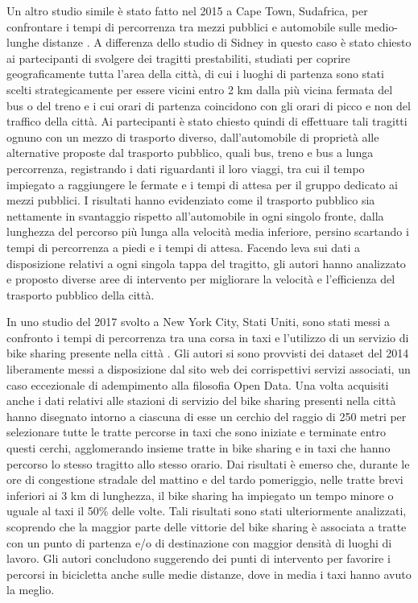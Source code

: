 Un altro studio simile è stato fatto nel 2015 a Cape Town, Sudafrica, per confrontare i tempi di percorrenza tra mezzi pubblici e automobile sulle medio-lunghe distanze \cite{hitge2015comparison}. A differenza dello studio di Sidney in questo caso è stato chiesto ai partecipanti di svolgere dei tragitti prestabiliti, studiati per coprire geograficamente tutta l'area della città, di cui i luoghi di partenza sono stati scelti strategicamente per essere vicini entro 2 km dalla più vicina fermata del bus o del treno e i cui orari di partenza coincidono con gli orari di picco e non del traffico della città. Ai partecipanti è stato chiesto quindi di effettuare tali tragitti ognuno con un mezzo di trasporto diverso, dall'automobile di proprietà alle alternative proposte dal trasporto pubblico, quali bus, treno e bus a lunga percorrenza, registrando i dati riguardanti il loro viaggi, tra cui il tempo impiegato a raggiungere le fermate e i tempi di attesa per il gruppo dedicato ai mezzi pubblici. I risultati hanno evidenziato come il trasporto pubblico sia nettamente in svantaggio rispetto all'automobile in ogni singolo fronte, dalla lunghezza del percorso più lunga alla velocità media inferiore, persino scartando i tempi di percorrenza a piedi e i tempi di attesa. Facendo leva sui dati a disposizione relativi a ogni singola tappa del tragitto, gli autori hanno analizzato e proposto diverse aree di intervento per migliorare la velocità e l'efficienza del trasporto pubblico della città.

In uno studio del 2017 svolto a New York City, Stati Uniti, sono stati messi a confronto i tempi di percorrenza tra una corsa in taxi e l'utilizzo di un servizio di bike sharing presente nella città \cite{faghih2017hail}. Gli autori si sono provvisti dei dataset del 2014 liberamente messi a disposizione dal sito web dei corrispettivi servizi associati, un caso eccezionale di adempimento alla filosofia Open Data. Una volta acquisiti anche i dati relativi alle stazioni di servizio del bike sharing presenti nella città hanno disegnato intorno a ciascuna di esse un cerchio del raggio di 250 metri per selezionare tutte le tratte percorse in taxi che sono iniziate e terminate entro questi cerchi, agglomerando insieme tratte in bike sharing e in taxi che hanno percorso lo stesso tragitto allo stesso orario. Dai risultati è emerso che, durante le ore di congestione stradale del mattino e del tardo pomeriggio, nelle tratte brevi inferiori ai 3 km di lunghezza, il bike sharing ha impiegato un tempo minore o uguale al taxi il 50\% delle volte. Tali risultati sono stati ulteriormente analizzati, scoprendo che la maggior parte delle vittorie del bike sharing è associata a tratte con un punto di partenza e/o di destinazione con maggior densità di luoghi di lavoro. Gli autori concludono suggerendo dei punti di intervento per favorire i percorsi in bicicletta anche sulle medie distanze, dove in media i taxi hanno avuto la meglio.

